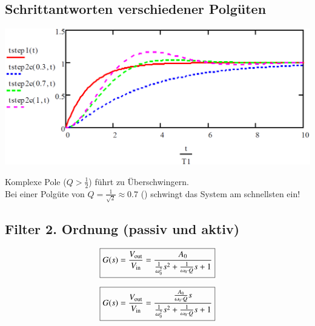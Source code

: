 \subsection{Schrittantworten verschiedener Polgüten}

\begin{minipage}[c]{0.48\columnwidth}
    \includegraphics[width=\columnwidth]{images/schrittantwort_verschiedene_polgueten.png}
\end{minipage}
\hfill
\begin{minipage}[c]{0.48\columnwidth}
    Komplexe Pole ($Q > \frac{1}{2}$) führt zu Überschwingern. \\
    Bei einer Polgüte von $Q = \frac{1}{\sqrt{2}} \approx 0.7$ () schwingt das System am schnellsten ein!
\end{minipage}


\subsection{Filter 2. Ordnung (passiv und aktiv)}

\begin{minipage}[c]{0.48\columnwidth}
    \begin{center}
    \end{center}
    $$ \boxed{ G(s) = \frac{V_{\rm out}}{V_{\rm in}} = \frac{A_0}{\frac{1}{\omega_0^2} s^2 + \frac{1}{\omega_0 \cdot Q} s + 1 } } $$
\end{minipage}
\hfill
\begin{minipage}[c]{0.48\columnwidth}
    \begin{center}
    \end{center}
    $$ \boxed{ G(s) = \frac{V_{\rm out}}{V_{\rm in}} = \frac{\frac{A_0}{\omega_0 \cdot Q} s}{\frac{1}{\omega_0^2} s^2 +  \frac{1}{\omega_0 \cdot Q} s + 1 } } $$
\end{minipage}

